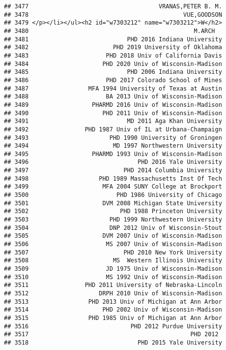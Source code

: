 \documentclass[
]{article}
\begin{document}
\begin{verbatim}
## 3477                                     VRANAS,PETER B. M.
## 3478                                            VUE,GOODSON
## 3479 </p></li></ul><h2 id="w7303212" name="w7303212">W</h2>
## 3480                                               M.ARCH  
## 3481                            PHD 2016 Indiana University
## 3482                        PHD 2019 University of Oklahoma
## 3483                      PHD 2018 Univ of California Davis
## 3484                     PHD 2020 Univ of Wisconsin-Madison
## 3485                            PHD 2006 Indiana University
## 3486                      PHD 2017 Colorado School of Mines
## 3487                 MFA 1994 University of Texas at Austin
## 3488                      BA 2013 Univ of Wisconsin-Madison
## 3489                  PHARMD 2016 Univ of Wisconsin-Madison
## 3490                     PHD 2011 Univ of Wisconsin-Madison
## 3491                            MD 2011 Aga Khan University
## 3492                PHD 1987 Univ of IL at Urbana-Champaign
## 3493                       PHD 1990 University of Groningen
## 3494                        MD 1997 Northwestern University
## 3495                  PHARMD 1993 Univ of Wisconsin-Madison
## 3496                               PHD 2016 Yale University
## 3497                           PHD 2014 Columbia University
## 3498                    PHD 1989 Massachusetts Inst Of Tech
## 3499                     MFA 2004 SUNY College at Brockport
## 3500                         PHD 1986 University of Chicago
## 3501                     DVM 2008 Michigan State University
## 3502                          PHD 1988 Princeton University
## 3503                       PHD 1999 Northwestern University
## 3504                       DNP 2012 Univ of Wisconsin-Stout
## 3505                     DVM 2007 Univ of Wisconsin-Madison
## 3506                      MS 2007 Univ of Wisconsin-Madison
## 3507                           PHD 2010 New York University
## 3508                        MS  Western Illinois University
## 3509                      JD 1975 Univ of Wisconsin-Madison
## 3510                      MS 1992 Univ of Wisconsin-Madison
## 3511                PHD 2011 University of Nebraska-Lincoln
## 3512                    DRPH 2010 Univ of Wisconsin-Madison
## 3513                 PHD 2013 Univ of Michigan at Ann Arbor
## 3514                     PHD 2002 Univ of Wisconsin-Madison
## 3515                 PHD 1985 Univ of Michigan at Ann Arbor
## 3516                             PHD 2012 Purdue University
## 3517                                              PHD 2012 
## 3518                               PHD 2015 Yale University

\end{verbatim}
\end{document}
